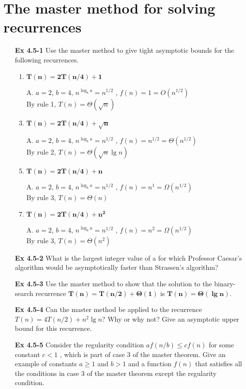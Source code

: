 \documentclass[fontsize=12pt,paper=a4]{book}
\begin{document}
\section{The master method for solving recurrences}
\begin{enumerate}
	\item[\textbf{Ex 4.5-1}]
		Use the master method to give tight asymptotic bounds for the following recurrences.
		\begin{enumerate}
			\item $\mathbf{T(n) = 2T(n/4) + 1}$
			\item[A.]
			$a=2$, $b=4$, $n^{\log_b a}=n^{1/2}$ , $f(n)=1=O(n^{1/2})$ \\
			By rule 1, $T(n) = \Theta(\sqrt{n})$	
					
			\item $\mathbf{T(n) = 2T(n/4) + \sqrt{n}}$
			\item[A.]
			$a=2$, $b=4$, $n^{\log_b a}=n^{1/2}$ , $f(n)=n^{1/2}=\Theta(n^{1/2})$\\						By rule 2, $T(n) = \Theta(\sqrt{n} \lg n)$
			
			\item $\mathbf{T(n) = 2T(n/4) + n}$
			\item[A.]
			$a=2$, $b=4$, $n^{\log_b a}=n^{1/2}$ , $f(n)=n^{1}=\Omega(n^{1/2})$\\
			By rule 3, $T(n) = \Theta(n)$
			
			\item $\mathbf{T(n) = 2T(n/4) + n^2}$
			\item[A.]
			$a=2$, $b=4$, $n^{\log_b a}=n^{1/2}$ , $f(n)=n^{2}=\Omega(n^{1/2})$\\
			By rule 3, $T(n) = \Theta(n^2)$
		\end{enumerate}
		
	\item[\textbf{Ex 4.5-2}]
		What is the largest integer value of a for which Professor Caesar’s algorithm would be asymptotically faster than Strassen’s algorithm?
		
	\item[\textbf{Ex 4.5-3}]
		Use the master method to show that the solution to the binary-search recurrence $\mathbf{T(n) = T(n/2)+ \Theta(1)}$ is $\mathbf{T(n)= \Theta(\lg n)}$.
		
	\item[\textbf{Ex 4.5-4}]
		Can the master method be applied to the recurrence $T(n) = 4T(n/2)+n^2 \lg n$? Why or why not? Give an asymptotic upper bound for this recurrence.

	\item[\textbf{Ex 4.5-5}]
		Consider the regularity condition $af(n/b) \leq cf(n)$ for some constant $c < 1$ , which is part of case 3 of the master theorem. Give an example of constants $a \geq 1$ and $b > 1$ and a function $f(n)$ that satisfies all the conditions in case 3 of the master theorem except the regularity condition.		
		
\end{enumerate}
\end{document}
